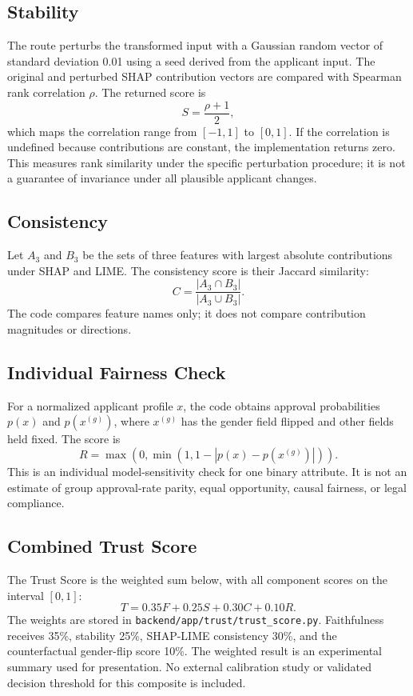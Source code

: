 \subsection{Stability}
The route perturbs the transformed input with a Gaussian random vector of standard deviation 0.01 using a seed derived from the applicant input. The original and perturbed SHAP contribution vectors are compared with Spearman rank correlation $\rho$. The returned score is
\begin{equation}
  S=\frac{\rho+1}{2},
\end{equation}
which maps the correlation range from $[-1,1]$ to $[0,1]$. If the correlation is undefined because contributions are constant, the implementation returns zero. This measures rank similarity under the specific perturbation procedure; it is not a guarantee of invariance under all plausible applicant changes.

\subsection{Consistency}
Let $A_3$ and $B_3$ be the sets of three features with largest absolute contributions under SHAP and LIME. The consistency score is their Jaccard similarity:
\begin{equation}
  C=\frac{|A_3\cap B_3|}{|A_3\cup B_3|}.
  \label{eq:consistency}
\end{equation}
The code compares feature names only; it does not compare contribution magnitudes or directions.

\subsection{Individual Fairness Check}
For a normalized applicant profile $x$, the code obtains approval probabilities $p(x)$ and $p(x^{(g)})$, where $x^{(g)}$ has the gender field flipped and other fields held fixed. The score is
\begin{equation}
  R=\max\left(0,\min\left(1,1-|p(x)-p(x^{(g)})|\right)\right).
  \label{eq:counterfactual}
\end{equation}
This is an individual model-sensitivity check for one binary attribute. It is not an estimate of group approval-rate parity, equal opportunity, causal fairness, or legal compliance.

\subsection{Combined Trust Score}
The Trust Score is the weighted sum below, with all component scores on the interval $[0,1]$:
\begin{equation}
  T=0.35F+0.25S+0.30C+0.10R.
  \label{eq:trust-score}
\end{equation}
The weights are stored in \texttt{backend/app/trust/trust\_score.py}. Faithfulness receives 35\%, stability 25\%, SHAP-LIME consistency 30\%, and the counterfactual gender-flip score 10\%. The weighted result is an experimental summary used for presentation. No external calibration study or validated decision threshold for this composite is included.

